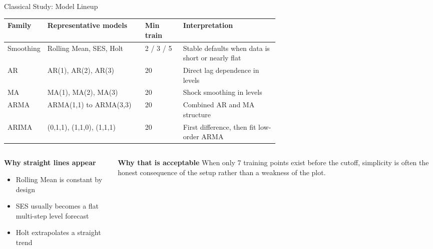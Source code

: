 \begin{frame}[t]{Classical Study: Model Lineup}
  \vspace{0.35em}

  \begin{panelbox}
    \small
    \begin{tabularx}{\linewidth}{L{0.13\linewidth}L{0.36\linewidth}C{0.14\linewidth}Y}
      \toprule
      \textbf{Family} & \textbf{Representative models} & \textbf{Min train} & \textbf{Interpretation} \\
      \midrule
      Smoothing & Rolling Mean, SES, Holt & 2 / 3 / 5 & Stable defaults when data is short or nearly flat \\
      AR & AR(1), AR(2), AR(3) & 20 & Direct lag dependence in levels \\
      MA & MA(1), MA(2), MA(3) & 20 & Shock smoothing in levels \\
      ARMA & ARMA(1,1) to ARMA(3,3) & 20 & Combined AR and MA structure \\
      ARIMA & (0,1,1), (1,1,0), (1,1,1) & 20 & First difference, then fit low-order ARMA \\
      \bottomrule
    \end{tabularx}
  \end{panelbox}

  \vspace{0.35em}
  \begin{columns}[T,onlytextwidth]
    \begin{panelbox}
      \textbf{Why straight lines appear}
      \begin{itemize}
        \item Rolling Mean is constant by design
        \item SES usually becomes a flat multi-step level forecast
        \item Holt extrapolates a straight trend
      \end{itemize}
    \end{panelbox}

    \begin{panelbox}
      \textbf{Why that is acceptable}
      When only 7 training points exist before the cutoff, simplicity is often the honest consequence of the setup rather than a weakness of the plot.
    \end{panelbox}
  \end{columns}
\end{frame}

